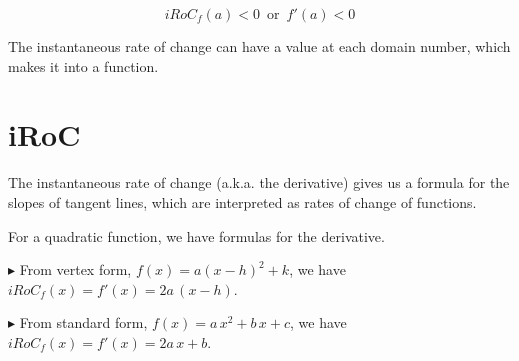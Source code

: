 \documentclass{ximera}
\begin{document}
\[
iRoC_f(a) < 0 \, \text{ or } \, f'(a) < 0
\]








The instantaneous rate of change can have a value at each domain number, which makes it into a function.






\section*{iRoC}


The instantaneous rate of change (a.k.a. the derivative) gives us a formula for the slopes of tangent lines, which are interpreted as rates of change of functions.

For a quadratic function, we have formulas for the derivative.



\textbf{\textcolor{red!70!darkgray}{$\blacktriangleright$}} From vertex form, $f(x) = a (x -h)^2 + k$, we have $iRoC_f(x) = f'(x) = 2 a \, (x-h)$. 



\textbf{\textcolor{red!70!darkgray}{$\blacktriangleright$}} From standard form, $f(x) = a \, x^2 + b \, x + c$, we have $iRoC_f(x) = f'(x) = 2 a \, x + b$. 
\end{document}
